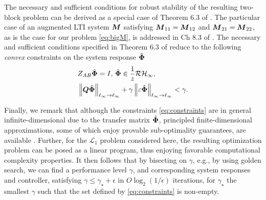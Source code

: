 The necessary and sufficient conditions for robust stability of the resulting two-block problem can be derived as a special case of Theorem 6.3 of \cite{khammash1990stability}.  The particular case of an  augmented LTI system $\boldsymbol{M}$ satisfying $\boldsymbol{M}_{11} = \boldsymbol{M}_{12}$ and $\boldsymbol{M}_{21} = \boldsymbol{M}_{22}$, as is the case for our problem \eqref{eq:bigM}, is addressed in Ch 8.3 of \cite{khammash1990stability}.  The necessary and sufficient conditions specified in Theorem 6.3 of \cite{khammash1990stability} reduce to the following \emph{convex} constraints on the system response $\hat{\boldsymbol{\Phi}}$
\begin{equation} \label{eq:constraints}
\begin{aligned}
&Z_{AB}\hat{\boldsymbol{\Phi}} = I, \, \hat{\boldsymbol{\Phi}} \in \frac{1}{z}\mathcal{RH}_\infty, \\
& \left\|\boldsymbol{Q}\hat{\boldsymbol{\Phi}}\right\|_{\ell_\infty\to\ell_\infty} + \gamma\left\|\varepsilon\hat{\boldsymbol{\Phi}}\right\|_{\ell_\infty\to\ell_\infty} < \gamma.
\end{aligned}
\end{equation}

Finally, we remark that although the constraints \eqref{eq:constraints} are in general infinite-dimensional due to the transfer matrix $\hat{\boldsymbol{\Phi}}$, principled finite-dimensional approximations, some of which enjoy provable sub-optimality guarantees, are available \cite{matni2017scalable,anderson2019system,dean2017sample,dean2018regret}.  Further, for the $\mathcal{L}_1$ problem considered here, the resulting optimization problem can be posed as a linear program, thus enjoying favorable computational complexity properties.
It then follows that by bisecting on $\gamma$, e.g., by using golden search, we can find a performance level $\gamma$, and corresponding system responses and controller, satisfying $\gamma \leq \gamma_\star + \epsilon$ in $O\log_2(1/\epsilon)$ iterations, for $\gamma_\star$ the smallest $\gamma$ such that the set defined by \eqref{eq:constraints} is non-empty.

